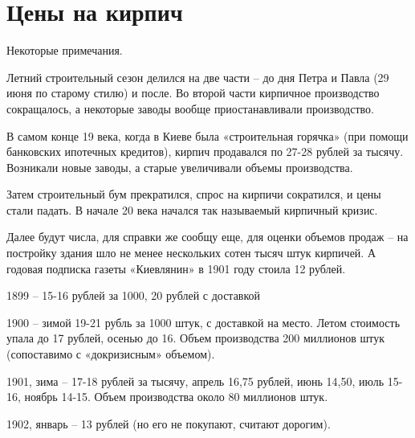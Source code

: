 \chapter*{Цены на кирпич}

Некоторые примечания.

Летний строительный сезон делился на две части – до дня Петра и Павла (29 июня по старому стилю) и после. Во второй части кирпичное производство сокращалось, а некоторые заводы вообще приостанавливали производство.

В самом конце 19 века, когда в Киеве была «строительная горячка» (при помощи банковских ипотечных кредитов), кирпич продавался по 27-28 рублей за тысячу. Возникали новые заводы, а старые увеличивали объемы производства. 

Затем строительный бум прекратился, спрос на кирпичи сократился, и цены стали падать.  В начале 20 века начался так называемый кирпичный кризис.

Далее будут числа, для справки же сообщу еще, для оценки объемов продаж – на постройку здания шло не менее нескольких сотен тысяч штук кирпичей. А годовая подписка газеты «Киевлянин» в 1901 году стоила 12 рублей.

1899 – 15-16 рублей за 1000, 20 рублей с доставкой

1900 – зимой 19-21 рубль за 1000 штук, с доставкой на место. Летом стоимость упала до 17 рублей, осенью до 16. Объем производства 200 миллионов штук (сопоставимо с «докризисным» объемом).

1901, зима – 17-18 рублей за тысячу, апрель 16,75 рублей, июнь 14,50, июль 15-16, ноябрь 14-15. 
Объем производства около 80 миллионов штук.

1902, январь – 13 рублей (но его не покупают, считают дорогим).
